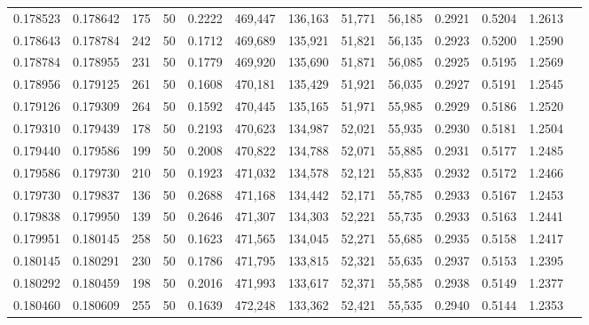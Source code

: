 \begin{tabular}{rrrrrrrrrrrrr}
0.178523 & 0.178642 &   175 &  50 &                                     0.2222 & 469,447 & 136,163 &  51,771 &  56,185 & 0.2921 & 0.5204 & 1.2613 \\
0.178643 & 0.178784 &   242 &  50 &                                     0.1712 & 469,689 & 135,921 &  51,821 &  56,135 & 0.2923 & 0.5200 & 1.2590 \\
0.178784 & 0.178955 &   231 &  50 &                                     0.1779 & 469,920 & 135,690 &  51,871 &  56,085 & 0.2925 & 0.5195 & 1.2569 \\
0.178956 & 0.179125 &   261 &  50 &                                     0.1608 & 470,181 & 135,429 &  51,921 &  56,035 & 0.2927 & 0.5191 & 1.2545 \\
0.179126 & 0.179309 &   264 &  50 &                                     0.1592 & 470,445 & 135,165 &  51,971 &  55,985 & 0.2929 & 0.5186 & 1.2520 \\
0.179310 & 0.179439 &   178 &  50 &                                     0.2193 & 470,623 & 134,987 &  52,021 &  55,935 & 0.2930 & 0.5181 & 1.2504 \\
0.179440 & 0.179586 &   199 &  50 &                                     0.2008 & 470,822 & 134,788 &  52,071 &  55,885 & 0.2931 & 0.5177 & 1.2485 \\
0.179586 & 0.179730 &   210 &  50 &                                     0.1923 & 471,032 & 134,578 &  52,121 &  55,835 & 0.2932 & 0.5172 & 1.2466 \\
0.179730 & 0.179837 &   136 &  50 &                                     0.2688 & 471,168 & 134,442 &  52,171 &  55,785 & 0.2933 & 0.5167 & 1.2453 \\
0.179838 & 0.179950 &   139 &  50 &                                     0.2646 & 471,307 & 134,303 &  52,221 &  55,735 & 0.2933 & 0.5163 & 1.2441 \\
0.179951 & 0.180145 &   258 &  50 &                                     0.1623 & 471,565 & 134,045 &  52,271 &  55,685 & 0.2935 & 0.5158 & 1.2417 \\
0.180145 & 0.180291 &   230 &  50 &                                     0.1786 & 471,795 & 133,815 &  52,321 &  55,635 & 0.2937 & 0.5153 & 1.2395 \\
0.180292 & 0.180459 &   198 &  50 &                                     0.2016 & 471,993 & 133,617 &  52,371 &  55,585 & 0.2938 & 0.5149 & 1.2377 \\
0.180460 & 0.180609 &   255 &  50 &                                     0.1639 & 472,248 & 133,362 &  52,421 &  55,535 & 0.2940 & 0.5144 & 1.2353 \\

\end{tabular}
